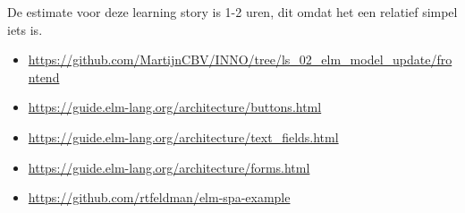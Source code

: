 \documentclass{article}
\begin{document}
    {
        De estimate voor deze learning story is 1-2 uren, dit omdat het een relatief simpel iets is.
    }
    {
        \begin{itemize}
            \item \url{https://github.com/MartijnCBV/INNO/tree/ls_02_elm_model_update/frontend}
        \end{itemize}
    }
    {
        \begin{itemize}
            \item \url{https://guide.elm-lang.org/architecture/buttons.html}
            \item \url{https://guide.elm-lang.org/architecture/text_fields.html}
            \item \url{https://guide.elm-lang.org/architecture/forms.html}
            \item \url{https://github.com/rtfeldman/elm-spa-example}
        \end{itemize}
    }
\end{document}

